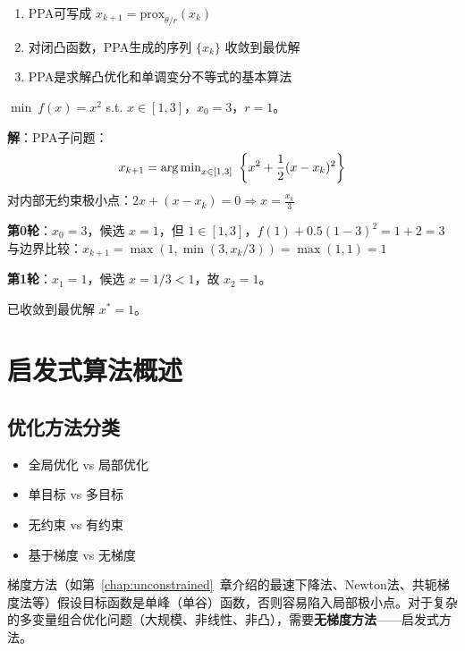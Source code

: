 \begin{property}[PPA性质]
\begin{enumerate}[label=(\arabic*)]
    \item PPA可写成 $x_{k+1} = \text{prox}_{\theta/r}(x_k)$
    \item 对闭凸函数，PPA生成的序列 $\{x_k\}$ 收敛到最优解
    \item PPA是求解凸优化和单调变分不等式的基本算法
\end{enumerate}
\end{property}

\begin{example}[PPA的迭代]
$\min\ f(x) = x^2$ s.t. $x \in [1, 3]$，$x_0 = 3$，$r = 1$。

\textbf{解}：PPA子问题：
\[
x_{k+1} = \operatorname{arg\,min}_{x \in [1,3]}\ \left\{x^2 + \frac{1}{2}(x - x_k)^2\right\}
\]
对内部无约束极小点：$2x + (x - x_k) = 0 \Rightarrow x = \frac{x_k}{3}$

\textbf{第0轮}：$x_0 = 3$，候选 $x = 1$，但 $1 \in [1,3]$，$f(1) + 0.5(1-3)^2 = 1 + 2 = 3$
与边界比较：$x_{k+1} = \max(1, \min(3, x_k/3)) = \max(1, 1) = 1$

\textbf{第1轮}：$x_1 = 1$，候选 $x = 1/3 < 1$，故 $x_2 = 1$。

已收敛到最优解 $x^* = 1$。
\end{example}

\section{启发式算法概述}\label{sec:heuristic-overview}

\subsection{优化方法分类}

\begin{conceptbox}[优化方法的多维分类]
\begin{itemize}[itemsep=0.3em]
    \item 全局优化 vs 局部优化
    \item 单目标 vs 多目标
    \item 无约束 vs 有约束
    \item 基于梯度 vs 无梯度
\end{itemize}
\end{conceptbox}

\begin{notebox}[梯度方法的限制]
梯度方法（如第~\ref{chap:unconstrained}~章介绍的最速下降法、Newton法、共轭梯度法等）假设目标函数是单峰（单谷）函数，否则容易陷入局部极小点。对于复杂的多变量组合优化问题（大规模、非线性、非凸），需要\textbf{无梯度方法}——启发式方法。
\end{notebox}

